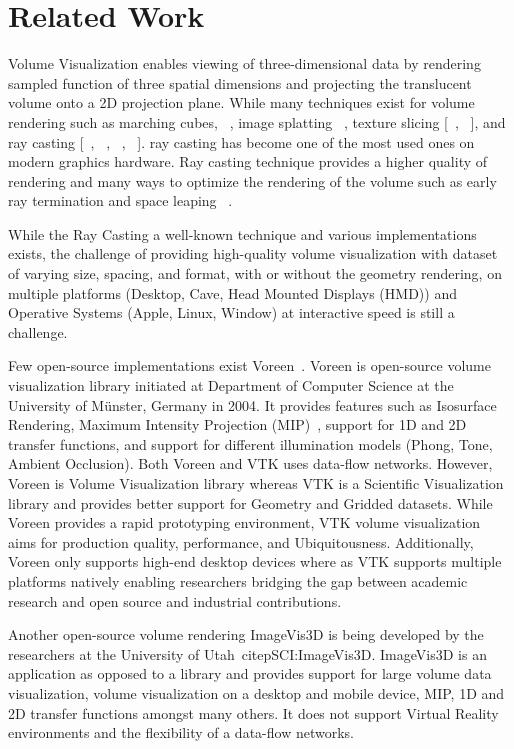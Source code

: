 \section{Related Work}
\label{relatedwork}

Volume Visualization enables viewing of three-dimensional data by rendering
sampled function of three spatial dimensions and projecting the translucent
volume onto a 2D projection plane. While many techniques exist for volume
rendering such as marching cubes, ~\citep{lorensen1987marching},
image splatting  ~\citep{westover1990footprint}, texture slicing
[~\citep{rezk2000interactive}, ~\citep{engel2001high}], and ray casting
[~\citep{hsu1993segmented}, ~\citep{ma1995parallel}, ~\citep{ma1997scalable},
~\citep{heng2006gpu}]. ray casting has become one of the most used ones on
modern graphics hardware. Ray casting technique provides a higher quality
of rendering and many ways to optimize the rendering of the volume such
as early ray termination and space leaping ~\citep{yagel1993accelerating}.

While the Ray Casting a well-known technique and various implementations
exists, the challenge of providing high-quality volume visualization with
dataset of varying size, spacing, and format, with or without the geometry
rendering, on multiple platforms (Desktop, Cave, Head Mounted Displays (HMD))
and Operative Systems (Apple, Linux, Window) at interactive speed is still a challenge.

Few open-source implementations exist Voreen~\citep{MRMH09}. Voreen is
open-source volume visualization library initiated at
Department of Computer Science at the University of Münster, Germany in 2004.
It provides features such as Isosurface Rendering,
Maximum Intensity Projection (MIP)~\citep{wallis1989three},
support for 1D and 2D transfer functions, and support for different illumination models
(Phong, Tone, Ambient Occlusion). Both Voreen and VTK uses data-flow networks. However,
Voreen is Volume Visualization library whereas VTK is a Scientific Visualization
library and provides better support for Geometry and Gridded datasets. While Voreen
provides a rapid prototyping environment, VTK volume visualization aims for production
quality, performance, and Ubiquitousness. Additionally, Voreen
only supports high-end desktop devices where as VTK supports multiple platforms
natively enabling researchers bridging the gap between academic research
and open source and industrial contributions.

Another open-source volume rendering ImageVis3D is being developed by the researchers
at the University of Utah~citep{SCI:ImageVis3D}. ImageVis3D is an application as opposed
to a library and provides support for large volume data visualization, volume visualization
on a desktop and mobile device, MIP, 1D and 2D transfer functions amongst many others.
It does not support Virtual Reality environments and the flexibility of a data-flow networks.

